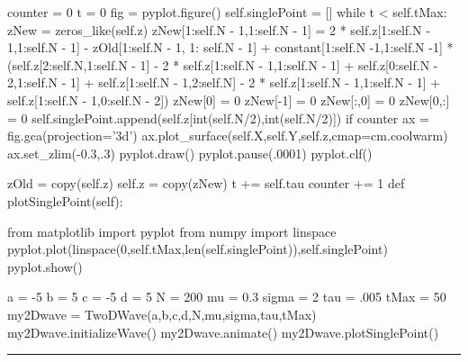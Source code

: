 \begin{codeexample}
\begin{VerbatimOut}{\listingFile}
        counter = 0
        t = 0
        fig = pyplot.figure()
        self.singlePoint = []
        while t < self.tMax:
            zNew = zeros_like(self.z)
            zNew[1:self.N - 1,1:self.N - 1] = 2 * self.z[1:self.N - 1,1:self.N - 1] - zOld[1:self.N - 1, 1: self.N - 1] + constant[1:self.N -1,1:self.N -1] * (self.z[2:self.N,1:self.N - 1] - 2 * self.z[1:self.N - 1,1:self.N - 1] + self.z[0:self.N - 2,1:self.N - 1] + self.z[1:self.N - 1,2:self.N] - 2 * self.z[1:self.N - 1,1:self.N - 1] + self.z[1:self.N - 1,0:self.N - 2])
            zNew[0] = 0
            zNew[-1] = 0
            zNew[:,0] = 0
            zNew[0,:] = 0
            self.singlePoint.append(self.z[int(self.N/2),int(self.N/2)])
            if counter %
                ax = fig.gca(projection='3d')
                ax.plot_surface(self.X,self.Y,self.z,cmap=cm.coolwarm)
                ax.set_zlim(-0.3,.3)
                pyplot.draw()
                pyplot.pause(.0001)
                pyplot.clf()
                
            zOld = copy(self.z)
            self.z = copy(zNew)
            t += self.tau
            counter += 1
    def plotSinglePoint(self):

        from matplotlib import pyplot
        from numpy import linspace
        pyplot.plot(linspace(0,self.tMax,len(self.singlePoint)),self.singlePoint)
        pyplot.show()

a = -5
b = 5
c = -5
d = 5
N = 200
mu = 0.3
sigma = 2
tau = .005
tMax = 50
my2Dwave = TwoDWave(a,b,c,d,N,mu,sigma,tau,tMax)
my2Dwave.initializeWave()
my2Dwave.animate()
my2Dwave.plotSinglePoint()

\end{VerbatimOut}
\end{codeexample}
\else
\noindent\rule{5 in}{0.01 in}
\fi


